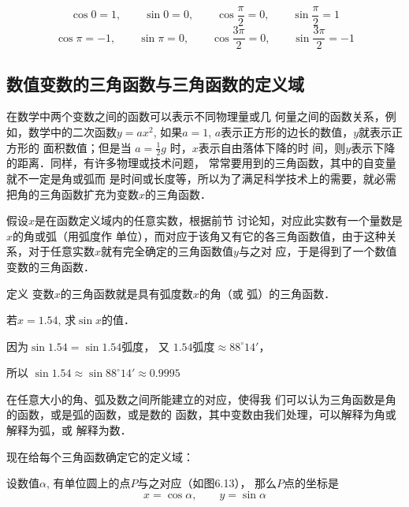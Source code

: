 \begin{example}
    $$\cos 0=1,\qquad \sin 0=0,\qquad \cos\frac{\pi}{2}=0,\qquad \sin\frac{\pi}{2}=1$$
    \[\cos\pi=-1,\qquad \sin\pi=0,\qquad \cos\frac{3\pi}{2}=0,\qquad \sin\frac{3\pi}{2}=-1\]
\end{example}

\subsection{数值变数的三角函数与三角函数的定义域}
在数学中两个变数之间的函数可以表示不同物理量或几
何量之间的函数关系，例如，数学中的二次函数$y=ax^2$,
如果$a=1$, $a$表示正方形的边长的数值，$y$就表示正方形的
面积数值；但是当
$a=\frac{1}{2}g$
时，$x$表示自由落体下降的时
间，则$y$表示下降的距离．同样，有许多物理或技术问题，
常常要用到的三角函数，其中的自变量就不一定是角或弧而
是时间或长度等，所以为了满足科学技术上的需要，就必需
把角的三角函数扩充为变数$x$的三角函数．

假设$x$是在函数定义域内的任意实数，根据前节
讨论知，对应此实数有一个量数是$x$的角或弧（用弧度作
单位），而对应于该角又有它的各三角函数值，由于这种关
系，对于任意实数$x$就有完全确定的三角函数值$y$与之对
应，于是得到了一个数值变数的三角函数．

\begin{blk}{定义}
 变数$x$的三角函数就是具有弧度数$x$的角（或
弧）的三角函数．    
\end{blk}


\begin{example}
    若$x=1.54$, 求$\sin x$的值．
\end{example}

\begin{solution}
    因为$\sin1.54=\sin1.54\text{弧度}$，
又 $1.54\text{弧度}\approx 88^{\circ}14'$，

所以
$\sin1.54\approx \sin88^{\circ}14'\approx 0.9995$
\end{solution}

在任意大小的角、弧及数之间所能建立的对应，使得我
们可以认为三角函数是角的函数，或是弧的函数，或是数的
函数，其中变数由我们处理，可以解释为角或解释为弧，或
解释为数．

现在给每个三角函数确定它的定义域：

设数值$\alpha$, 有单位圆上的点$P$与之对应（如图6.13），
那么$P$点的坐标是
\[x=\cos\alpha,\qquad y=\sin\alpha\]

\begin{figure}[htp]
    \centering
{}
    \caption{}
\end{figure}


